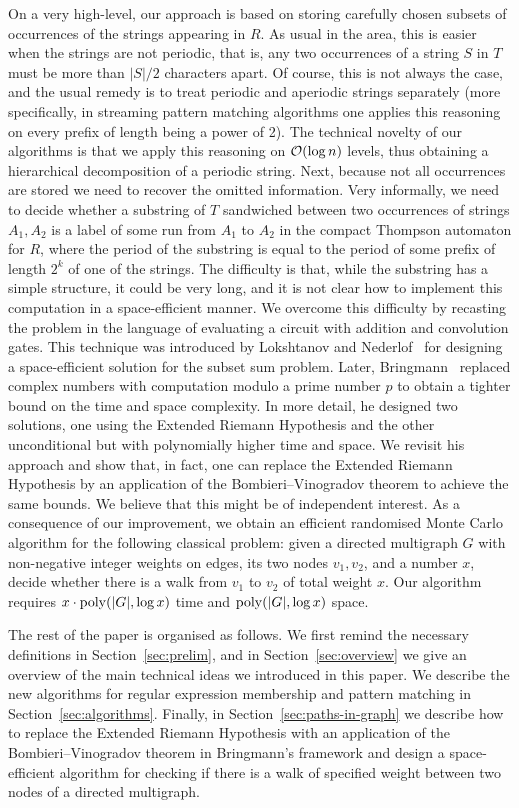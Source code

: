 On a very high-level, our approach is based on storing carefully chosen subsets of occurrences of the strings appearing in $R$.
As usual in the area, this is easier when the strings are not periodic, that is, any two occurrences of a string $S$ in $T$ must
be more than $|S|/2$ characters apart. Of course, this is not always the case, and the usual remedy is to treat periodic
and aperiodic strings separately (more specifically, in streaming pattern matching algorithms one applies this reasoning
on every prefix of length being a power of 2).
The technical novelty of our algorithms is that we apply this reasoning on $\mathcal{O}(\log n)$ levels, thus obtaining
a hierarchical decomposition of a periodic string.
Next, because not all occurrences are stored we need to recover the omitted information.
Very informally, we need to decide whether a substring of $T$ sandwiched between two occurrences of strings $A_1,A_2$ is a label of some run from $A_1$ to $A_2$ in the compact Thompson automaton for $R$, where the period of the substring is equal to the period of
some prefix of length $2^{k}$ of one of the strings. The difficulty is that, while the substring has a simple structure, it could be
very long, and it is not clear how to implement this computation in a space-efficient manner.
We overcome this difficulty by recasting the problem in the language of evaluating a circuit with addition
and convolution gates. This technique was introduced by Lokshtanov and Nederlof~\cite{LokshtanovN10} for designing
a space-efficient solution for the subset sum problem. Later, Bringmann~\cite{Bringmann17} replaced
complex numbers with computation modulo a prime number $p$ to obtain a tighter bound on the time and space complexity.
In more detail, he designed two solutions, one using the Extended Riemann Hypothesis and the other unconditional but
with polynomially higher time and space.
We revisit his approach and show that, in fact, one can replace the Extended Riemann Hypothesis by an application
of the Bombieri--Vinogradov theorem to achieve the same bounds. We believe that this might be of independent interest.
As a consequence of our improvement, we obtain an efficient randomised Monte Carlo algorithm for the following classical problem: given a directed multigraph $G$ with non-negative integer weights on edges, its two nodes $v_1,v_2$, and a number $x$, decide whether there is a walk from $v_1$ to $v_2$ of total weight $x$. Our algorithm requires $x\cdot\mathrm{poly}(|G|,\log x)$ time and $\mathrm{poly}(|G|,\log x)$ space.

The rest of the paper is organised as follows. We first remind the necessary definitions in Section~\ref{sec:prelim}, and in Section~\ref{sec:overview} we give an overview of the main technical ideas we introduced in this paper. We describe the new algorithms for regular expression membership and pattern matching in Section~\ref{sec:algorithms}. Finally, in Section~\ref{sec:paths-in-graph} we describe how to
replace the Extended Riemann Hypothesis with an application of the Bombieri--Vinogradov theorem
in Bringmann's framework and design a space-efficient algorithm for checking if there is a walk of specified weight between
two nodes of a directed multigraph.
